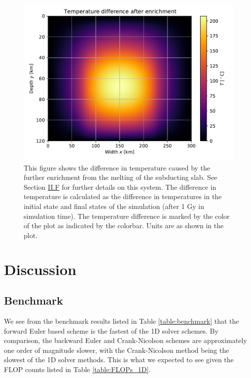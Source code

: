 \documentclass[reprint,english,notitlepage]{revtex4-1}  %
\begin{document}
\begin{figure}[H]
\centering
\includegraphics[width=\columnwidth]{../data/2D_heat_temp_diff.pdf}
\caption{This figure shows the difference in temperature caused by the further enrichment from the melting of the subducting slab. See Section \hyperref[sec:formalism_temp_dist_lithosphere]{II.F} for further details on this system. The difference in temperature is calculated as the difference in temperatures in the initial state and final states of the simulation (after 1 Gy in simulation time). The temperature difference is marked by the color of the plot as indicated by the colorbar. Units are as shown in the plot.} \label{fig:lithosphere_temp_diff}
\end{figure}


\clearpage

\section{Discussion} \label{sec:discussion}

\subsection{Benchmark} \label{sec:discussion_benchmark}
We see from the benchmark results listed in Table \ref{table:benchmark} that the forward Euler based scheme is the fastest of the 1D solver schemes. By comparison, the backward Euler and Crank-Nicolson schemes are approximately one order of magnitude slower, with the Crank-Nicolson method being the slowest of the 1D solver methods. This is what we expected to see given the FLOP counts listed in Table \ref{table:FLOPs_1D}.
\end{document}

